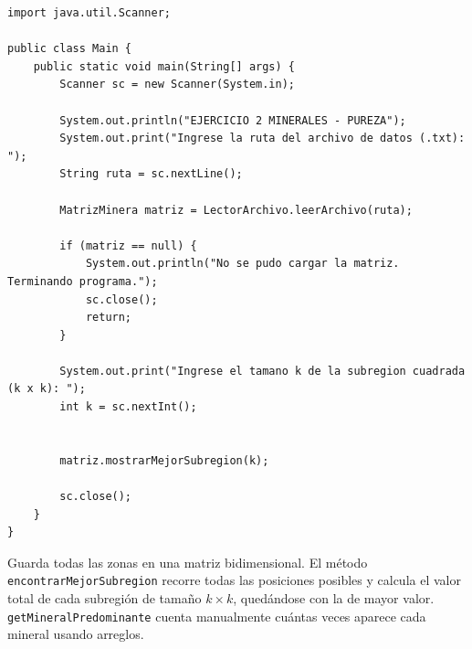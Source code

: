 \documentclass[12pt]{article}
\begin{document}
\begin{verbatim}
import java.util.Scanner;

public class Main {
    public static void main(String[] args) {
        Scanner sc = new Scanner(System.in);

        System.out.println("EJERCICIO 2 MINERALES - PUREZA");
        System.out.print("Ingrese la ruta del archivo de datos (.txt): ");
        String ruta = sc.nextLine();

        MatrizMinera matriz = LectorArchivo.leerArchivo(ruta);

        if (matriz == null) {
            System.out.println("No se pudo cargar la matriz. Terminando programa.");
            sc.close();
            return;
        }

        System.out.print("Ingrese el tamano k de la subregion cuadrada (k x k): ");
        int k = sc.nextInt();


        matriz.mostrarMejorSubregion(k);

        sc.close();
    }
}
\end{verbatim}

Guarda todas las zonas en una matriz bidimensional. El método 
\texttt{encontrarMejorSubregion} recorre todas las posiciones posibles 
y calcula el valor total de cada subregión de tamaño $k \times k$, quedándose 
con la de mayor valor. \texttt{getMineralPredominante} cuenta manualmente 
cuántas veces aparece cada mineral usando arreglos.
\end{document}
